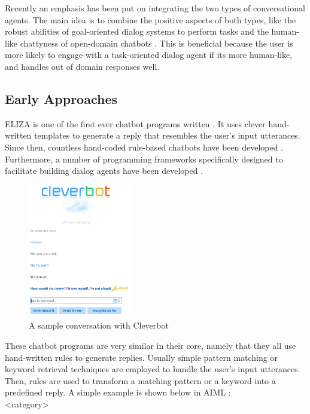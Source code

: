 \documentclass[12pt]{article}
\begin{document}
Recently an emphasis has been put on integrating the two types of conversational agents. The main idea is to combine the positive aspects of both types, like the robust abilities of goal-oriented dialog systems to perform tasks and the human-like chattyness of open-domain chatbots \cite{Zhao:2017,Yu:2017,Serban:2017}. This is beneficial because the user is more likely to engage with a task-oriented dialog agent if its more human-like, and handles out of domain responses well.

\subsection{Early Approaches} \label{ssec:22}

ELIZA is one of the first ever chatbot programs written \cite{Weizenbaum:1966}. It uses clever hand-written templates to generate a reply that resembles the user's input utterances. Since then, countless hand-coded rule-based chatbots have been developed \cite{Wallace:2009,Cleverbot:2017,Mitsuku:2017}. Furthermore, a number of programming frameworks specifically designed to facilitate building dialog agents have been developed \cite{Marietto:2013,Microsoft:2017}.

\begin{figure}[H]
	\centering
	\includegraphics[width=0.4\textwidth]{pics/cleverbot.png}
	\caption{A sample conversation with Cleverbot \cite{Cleverbot:2017}}
	\label{fig:22a}
\end{figure}


These chatbot programs are very similar in their core, namely that they all use hand-written rules to generate replies. Usually simple pattern matching or keyword retrieval techniques are employed to handle the user's input utterances. Then, rules are used to transform a matching pattern or a keyword into a predefined reply.
A simple example is shown below in AIML \cite{Marietto:2013}:\\
{\color{OliveGreen}\textless category\textgreater}
\end{document}
